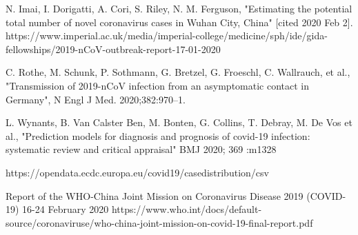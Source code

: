 \documentclass[aps,preprint]{revtex4}
\begin{document}
\begin{thebibliography}{99}
N. Imai, I. Dorigatti, A. Cori, S. Riley, N. M. Ferguson, "Estimating the potential total number of novel coronavirus cases in Wuhan City, China" [cited 2020 Feb 2]. https://www.imperial.ac.uk/media/imperial-college/medicine/sph/ide/gida-fellowships/2019-nCoV-outbreak-report-17-01-2020

C. Rothe, M. Schunk, P. Sothmann, G. Bretzel, G. Froeschl, C. Wallrauch, et al., "Transmission of 2019-nCoV infection from an asymptomatic contact in Germany",  N Engl J Med. 2020;382:970–1.

L. Wynants, B. Van Calster Ben, M. Bonten, G. Collins, T. Debray, M. De Vos et al., "Prediction models for diagnosis and prognosis of covid-19 infection: systematic review and critical appraisal" BMJ 2020; 369 :m1328

https://opendata.ecdc.europa.eu/covid19/casedistribution/csv

Report of the WHO-China Joint Mission on Coronavirus Disease 2019 (COVID-19) 16-24 February 2020
https://www.who.int/docs/default-source/coronaviruse/who-china-joint-mission-on-covid-19-final-report.pdf




\end{thebibliography}
\end{document}
